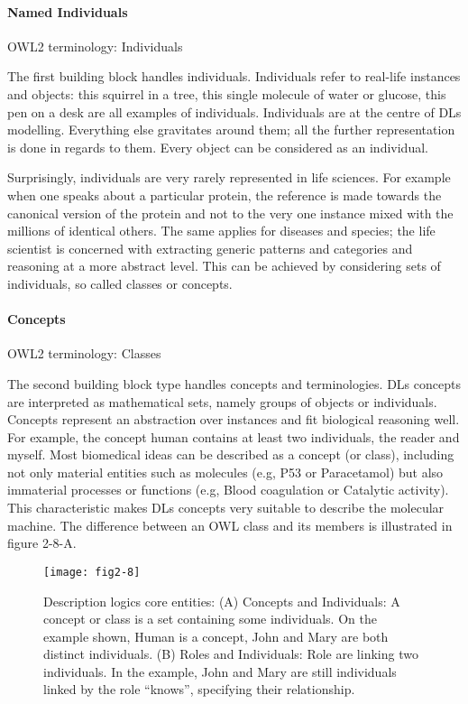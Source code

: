 \paragraph{\textbf{Named Individuals}\\}

OWL2 terminology: Individuals

The first building block handles individuals. Individuals refer to real-life instances and objects: this squirrel in a tree, this single molecule of water or glucose, this pen on a desk are all examples of individuals. Individuals are at the centre of DLs modelling. Everything else gravitates around them; all the further representation is done in regards to them. Every object can be considered as an individual.

Surprisingly, individuals are very rarely represented in life sciences. For example when one speaks about a particular protein, the reference is made towards the canonical version of the protein and not to the very one instance mixed with the millions of identical others. The same applies for diseases and species; the life scientist is concerned with extracting generic patterns and categories and reasoning at a more abstract level. This can be achieved by considering sets of individuals, so called classes or concepts.

\paragraph{\textbf{Concepts}\\}

OWL2 terminology: Classes

The second building block type handles concepts and terminologies. DLs concepts are interpreted as mathematical sets, namely groups of objects or individuals. Concepts represent an abstraction over instances and fit biological reasoning well. For example, the concept human contains at least two individuals, the reader and myself. Most biomedical ideas can be described as a concept (or class), including not only material entities such as molecules (e.g, P53 or Paracetamol) but also immaterial processes or functions (e.g, Blood coagulation or Catalytic activity). This characteristic makes DLs concepts very suitable to describe the molecular machine. The difference between an OWL class and its members is illustrated in figure 2-8-A.

\begin{figure}[ht]
    \centering
    \texttt{[image: fig2-8]}
    \caption{Description logics core entities: (A) Concepts and Individuals: A concept or class is a set containing some individuals. On the example shown, Human is a concept, John and Mary are both distinct individuals. (B) Roles and Individuals: Role are linking two individuals. In the example, John and Mary are still individuals linked by the role “knows”, specifying their relationship.}
    \label{fig2-8}
\end{figure}

